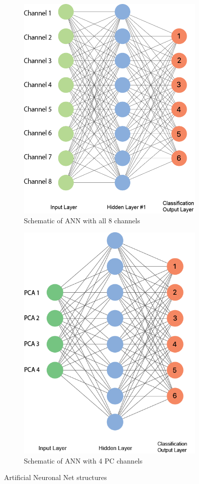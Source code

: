 \documentclass{article}
\begin{document}
\begin{figure}[h]
\centering
\begin{subfigure}{.5\textwidth}
  \centering
  \includegraphics[width=.9\linewidth]{Graphics/1-layer-NN}
  \caption{Schematic of ANN with all 8 channels }
  \label{fig:1Layer}
\end{subfigure}%
\begin{subfigure}{.6\textwidth}
  \centering
  \includegraphics[width=.7\linewidth]{Graphics/1-layer-PCA-NN}
  \caption{Schematic of ANN with 4 PC channels}
  \label{fig:PCA1Layer}
\end{subfigure}
\caption{Artificial Neuronal Net structures}
\label{gig:Model}
\end{figure}
\end{document}
